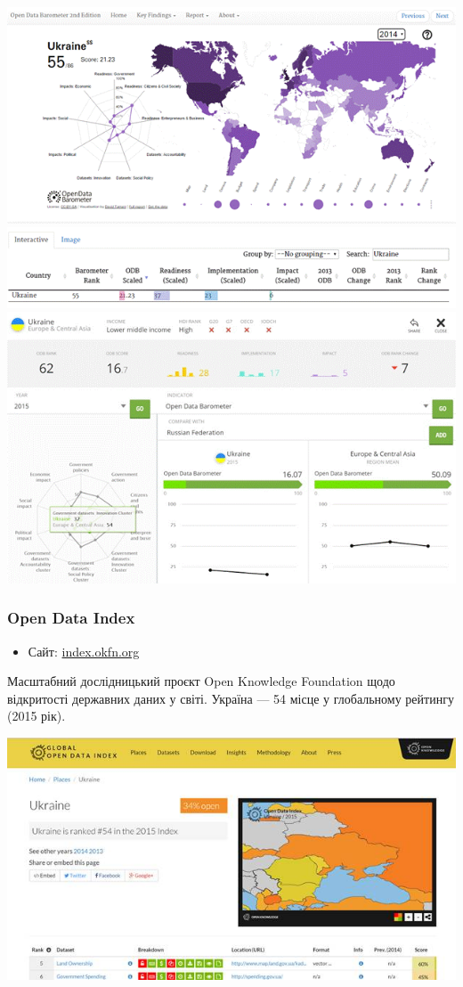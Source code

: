 \includegraphics{images/010.gif}
\includegraphics{images/011.gif}
\includegraphics{images/012.gif}

\subsubsection{Open Data Index}

\begin{itemize}
    \item Сайт: \href{https://index.okfn.org/}{index.okfn.org}
\end{itemize}

Масштабний дослідницький проєкт Open Knowledge Foundation щодо відкритості державних даних у світі. Україна — 54 місце у глобальному рейтингу (2015 рік).

\includegraphics{images/013.jpg}

